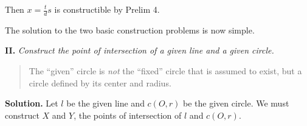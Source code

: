 \documentclass[11pt,a4paper]{article}
\newcommand*{\qed}{%
$\quad\quad$\raisebox{2pt}{\framebox[10pt]{\rule{0pt}{4pt}}}%
}
\begin{document}
Then $x=\frac{t}{d}s$ is constructible by Prelim 4. \qed

\newpage

The solution to the two basic construction problems is now simple. 

\textbf{II.} \textit{Construct the point of intersection of a given line and a given circle.}
\begin{quote}
\vspace*{-10pt}
The ``given'' circle is \emph{not} the ``fixed'' circle that is assumed to exist, but a circle defined by its center and radius.
\vspace*{-10pt}
\end{quote}

\textbf{Solution.} Let $l$ be the given line and $c(O,r)$ be the given circle. We must construct $X$ and $Y$, the points of intersection of $l$ and $c(O,r)$. 
\end{document}
